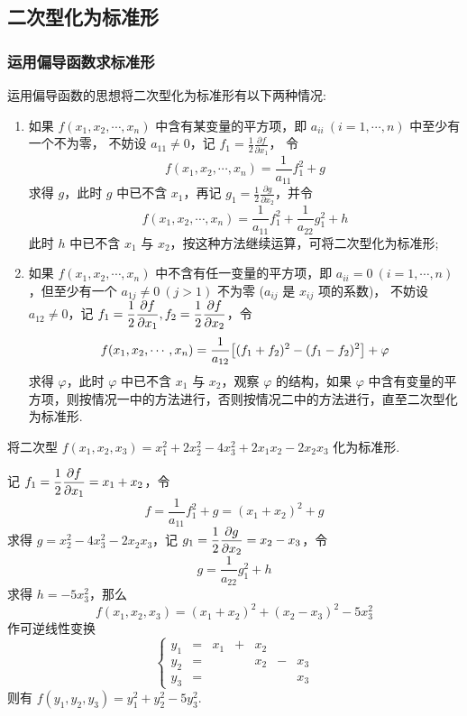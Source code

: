\subsection{二次型化为标准形}

\subsubsection{运用偏导函数求标准形}

运用偏导函数的思想将二次型化为标准形有以下两种情况:
\begin{enumerate}[label=(\arabic{*})]
    \item 如果 $ f(x_1,x_2,\cdots,x_n) $ 中含有某变量的平方项，即 $ a_{i i}~ (i=1, \cdots, n) $ 中至少有一个不为零，
          不妨设 $ a_{11} \neq 0 $，记 $ \displaystyle f_{1}=\frac{1}{2} \frac{\partial f}{\partial x_{1}}$，
          令 $$f(x_1,x_2,\cdots,x_n)=\frac{1}{a_{11}}f_1^2+g$$
          求得 $ g $，此时 $ g $ 中已不含 $ x_{1}$，再记 $ \displaystyle g_{1}=\frac{1}{2} \frac{\partial g}{\partial x_{2}} $，并令
          $$f(x_1,x_2,\cdots,x_n)=\frac{1}{a_{11}}f_1^2+\frac{1}{a_{22}}g_1^2+h$$
          此时 $h$ 中已不含 $x_1$ 与 $x_2$，按这种方法继续运算，可将二次型化为标准形;
    \item 如果 $f(x_1,x_2,\cdots,x_n)$ 中不含有任一变量的平方项，即 $a_{ii}=0~ (i=1,\cdots,n)$，但至少有一个 $a_{1j}\neq 0~ (j>1)$ 不为零 ($a_{ij}$ 是 $x_{ij}$ 项的系数)，
          不妨设 $a_{12}\neq 0$，记 $f_1=\dfrac{1}{2}\displaystyle\pdv{f}{x_1},f_2=\dfrac{1}{2}\displaystyle\pdv{f}{x_2}$，令
          $$f(x_1,x_2,\cdots,x_n)=\dfrac{1}{a_{12}}\qty[(f_1+f_2)^2-(f_1-f_2)^2]+\varphi$$
          求得 $\varphi$，此时 $\varphi$ 中已不含 $x_1$ 与 $x_2$，观察 $\varphi$ 的结构，如果 $\varphi$ 中含有变量的平方项，则按情况一中的方法进行，否则按情况二中的方法进行，直至二次型化为标准形.
\end{enumerate}

\begin{example}
    将二次型 $f(x_1,x_2,x_3)=x_1^2+2x_2^2-4x_3^2+2x_1x_2-2x_2x_3$ 化为标准形.
\end{example}
\begin{solution}
    记 $f_1=\dfrac{1}{2}\displaystyle\pdv{f}{x_1}=x_1+x_2$，令 $$f=\dfrac{1}{a_{11}}f_1^2+g=(x_1+x_2)^2+g$$
    求得 $g=x_2^2-4x_3^2-2x_2x_3$，记 $g_1=\dfrac{1}{2}\displaystyle\pdv{g}{x_2}=x_2-x_3$，令 $$g=\dfrac{1}{a_{22}}g_1^2+h$$
    求得 $h=-5x_3^2$，那么 $$f(x_1,x_2,x_3)=(x_1+x_2)^2+(x_2-x_3)^2-5x_3^2$$
    作可逆线性变换 $$\left\{\begin{matrix}
            y_1 & = & x_1 & + & x_2           \\
            y_2 & = &     &   & x_2 & - & x_3 \\
            y_3 & = &     &   &     &   & x_3
        \end{matrix}\right.$$
    则有 $f(y_1,y_2,y_3)=y_1^2+y_2^2-5y_3^2.$
\end{solution}

